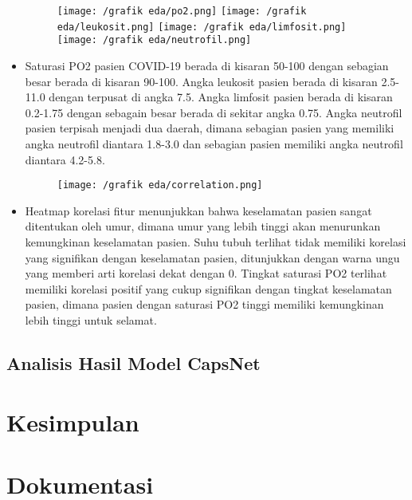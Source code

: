 \documentclass{article}
\begin{document}
\begin{itemize}
		\begin{figure}[H]
			\centering
			\texttt{[image: /grafik eda/po2.png]}
			\texttt{[image: /grafik eda/leukosit.png]}
			\texttt{[image: /grafik eda/limfosit.png]}
			\texttt{[image: /grafik eda/neutrofil.png]}
		\end{figure}
		\item Saturasi PO2 pasien COVID-19 berada di kisaran 50-100 dengan sebagian besar berada di kisaran 90-100. Angka leukosit pasien berada di kisaran 2.5-11.0 dengan terpusat di angka 7.5. Angka limfosit pasien berada di kisaran 0.2-1.75 dengan sebagain besar berada di sekitar angka 0.75. Angka neutrofil pasien terpisah menjadi dua daerah, dimana sebagian pasien yang memiliki angka neutrofil diantara 1.8-3.0 dan sebagian pasien memiliki angka neutrofil diantara 4.2-5.8.
		
		\begin{figure}[H]
			\centering
			\texttt{[image: /grafik eda/correlation.png]}
		\end{figure}
		\item Heatmap korelasi fitur menunjukkan bahwa keselamatan pasien sangat ditentukan oleh umur, dimana umur yang lebih tinggi akan menurunkan kemungkinan keselamatan pasien. Suhu tubuh terlihat tidak memiliki korelasi yang signifikan dengan keselamatan pasien, ditunjukkan dengan warna ungu yang memberi arti korelasi dekat dengan 0. Tingkat saturasi PO2 terlihat memiliki korelasi positif yang cukup signifikan dengan tingkat keselamatan pasien, dimana pasien dengan saturasi PO2 tinggi memiliki kemungkinan lebih tinggi untuk selamat. 
    	
     \end{itemize}
   	\subsection{Analisis Hasil Model CapsNet}
   \section{Kesimpulan}
   \section{Dokumentasi}
   
   \printbibliography
\end{document}
